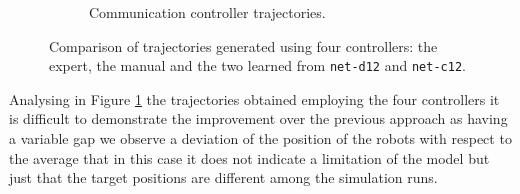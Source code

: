 \begin{figure}[H]
\begin{center}
\begin{subfigure}[h]{0.49\textwidth}
			\caption{Communication controller trajectories.}
		\end{subfigure}
	\end{center}
	\vspace{-0.5cm}
	\caption[Evaluation of the trajectories learned by \texttt{net-c12}.]{Comparison 
	of trajectories generated using four controllers: the expert, the manual and 
	the two learned from \texttt{net-d12} and \texttt{net-c12}.}
	\label{fig:net-c12traj}
\end{figure}
Analysing in Figure \ref{fig:net-c12traj} the trajectories obtained employing the 
four controllers it is difficult to demonstrate the improvement over the previous 
approach as having a variable gap we observe a deviation of the position of the 
robots with respect to the average that in this case it does not indicate a limitation 
of the model but just that the target positions are different among the simulation 
runs. 

